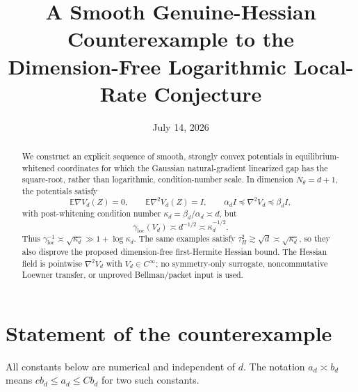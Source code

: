 \documentclass[11pt]{article}
\title{A Smooth Genuine-Hessian Counterexample to the\\
Dimension-Free Logarithmic Local-Rate Conjecture}
\author{}
\date{July 14, 2026}
\numberwithin{equation}{section}
\newcommand{\E}{\mathbb E}
\newcommand{\loc}{\mathrm{loc}}
\begin{document}
\maketitle

\begin{abstract}
We construct an explicit sequence of smooth, strongly convex potentials in
equilibrium-whitened coordinates for which the Gaussian natural-gradient
linearized gap has the square-root, rather than logarithmic, condition-number
scale.  In dimension $N_\theta=d+1$, the potentials satisfy
\[
  \E\nabla V_d(Z)=0,\qquad \E\nabla^2V_d(Z)=I,
  \qquad
  \alpha_d I\preceq\nabla^2V_d\preceq\beta_d I,
\]
with post-whitening condition number $\kappa_d=\beta_d/\alpha_d\asymp d$,
but
\[
  \gamma_{\loc}(V_d)\asymp d^{-1/2}\asymp\kappa_d^{-1/2}.
\]
Thus $\gamma_{\loc}^{-1}\asymp\sqrt{\kappa_d}\gg1+\log\kappa_d$.
The same examples satisfy $\tau_H^2\gtrsim\sqrt d\asymp\sqrt{\kappa_d}$,
so they also disprove the proposed dimension-free first-Hermite Hessian
bound.  The Hessian field is pointwise $\nabla^2V_d$ with
$V_d\in C^\infty$; no symmetry-only surrogate, noncommutative Loewner
transfer, or unproved Bellman/packet input is used.
\end{abstract}

\section{Statement of the counterexample}

All constants below are numerical and independent of $d$.  The notation
$a_d\asymp b_d$ means $c b_d\le a_d\le C b_d$ for two such constants.
\end{document}
